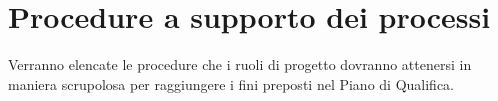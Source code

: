 %


\newpage
\section{Procedure a supporto dei processi}
\label{6.0}
Verranno elencate le procedure che i ruoli di progetto dovranno attenersi in maniera scrupolosa per raggiungere i fini preposti nel Piano di Qualifica.


